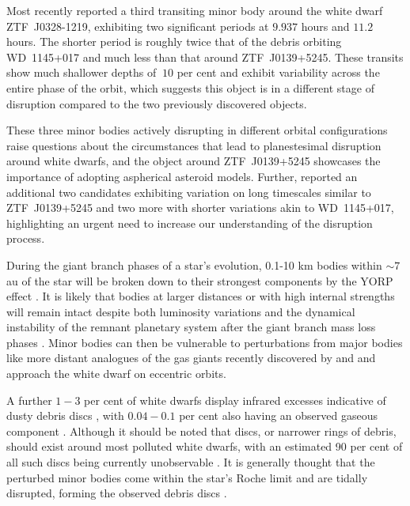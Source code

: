 \documentclass[fleqn,usenatbib]{mnras}
\begin{document}
Most recently \cite{Vanderbosch2021} reported a third transiting minor body around the white dwarf ZTF~J0328-1219, exhibiting two significant periods at $9.937$ hours and $11.2$ hours.
The shorter period is roughly twice that of the debris orbiting WD~1145+017 and much less than that around ZTF~J0139+5245.
These transits show much shallower depths of $~10$ per cent and exhibit variability across the entire phase of the orbit, which suggests this object is in a different stage of disruption compared to the two previously discovered objects.

These three minor bodies actively disrupting in different orbital configurations raise questions about the circumstances that lead to planestesimal disruption around white dwarfs, and the object around ZTF~J0139+5245 showcases the importance of adopting aspherical asteroid models.
Further, \cite{Guidry2021} reported an additional two candidates exhibiting variation on long timescales similar to ZTF~J0139+5245 and two more with shorter variations akin to WD~1145+017, highlighting an urgent need to increase our understanding of the disruption process.


During the giant branch phases of a star's evolution, 0.1-10 km bodies within $\sim 7$ au of the star will be broken down to their strongest components by the YORP effect \citep{Veras2014b}.
It is likely that bodies at larger distances or with high internal strengths \citep{Veras2020e} will remain intact despite both luminosity variations and the dynamical instability of the remnant planetary system after the giant branch mass loss phases \citep{Debes2002, Veras2015a, Veras2016b, Mustill2018, Maldonado2020c, Maldonado2020b, Maldonado2020a}.
Minor bodies can then be vulnerable to perturbations from major bodies like more distant analogues of the gas giants recently discovered by \cite{Gansicke2019} and \cite{Vanderburg2020} and approach the white dwarf on eccentric orbits.

A further $1-3$ per cent of white dwarfs display infrared excesses indicative of dusty debris discs \citep{RebassaMansergas2019}, with $0.04-0.1$ per cent also having an observed gaseous component \citep{Gansicke2006, Manser2020}.
Although it should be noted that discs, or narrower rings of debris, should exist around most polluted white dwarfs, with an estimated 90 per cent of all such discs being currently unobservable \citep{Rocchetto2015}. 
It is generally thought that the perturbed minor bodies come within the star's Roche limit and are tidally disrupted, forming the observed debris discs \citep{Debes2012, Veras2014a, Malamud2020a}.
\end{document}
